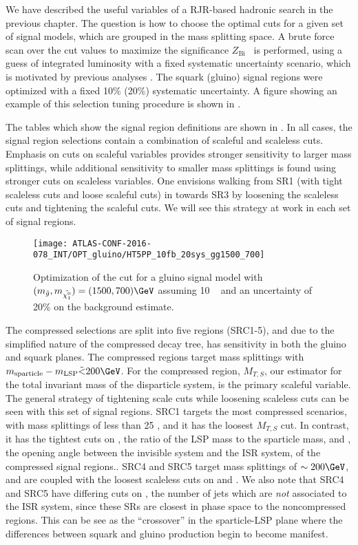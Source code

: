 We have described the useful variables of a RJR-based hadronic search in the previous chapter.
The question is how to choose the optimal cuts for a given set of signal models, which are grouped in the mass splitting space.
A brute force scan over the cut values to maximize the significance  $Z_{\text{Bi}}$~\cite{Cousins:2008zz} is performed, using a guess of integrated luminosity with a fixed systematic uncertainty scenario, which is motivated by previous analyses \cite{0-leptonPaper,0LPaper_13TeV}.
The squark (gluino) signal regions were optimized with a fixed 10\% (20\%) systematic uncertainty.
A figure showing an example of this selection tuning procedure is shown in .

The tables which show the signal region definitions are shown in .
In all cases, the signal region selections contain a combination of scaleful and scaleless cuts.
Emphasis on cuts on scaleful variables provides stronger sensitivity to larger mass splittings, while additional sensitivity to smaller mass splittings is found using stronger cuts on scaleless variables.
One envisions walking from SR1 (with tight scaleless cuts and loose scaleful cuts) in  towards SR3 by loosening the scaleless cuts and tightening the scaleful cuts.
We will see this strategy at work in each set of signal regions.

\begin{figure}[tbp]
\caption{Optimization of the  cut for a gluino signal model with $(m_{\gluino}, m_{\lsp} ) = (1500,700) \GeV $ assuming 10 \ifb~ and an uncertainty of 20\% on the background estimate.
} \label{fig:sr_optimization}
\texttt{[image: ATLAS-CONF-2016-078\_INT/OPT\_gluino/HT5PP\_10fb\_20sys\_gg1500\_700]}
\end{figure}

The compressed selections are split into five regions (SRC1-5), and due to the simplified nature of the compressed decay tree, has sensitivity in both the gluino and squark planes.
The compressed regions target mass splittings with $m_{\text{sparticle}} - m_{\text{LSP}} \tilde{<} 200 \GeV$.
For the compressed region, $M_{T, S}$, our estimator for the total invariant mass of the disparticle system, is the primary scaleful variable.
The general strategy of tightening scale cuts while loosening scaleless cuts can be seen with this set of signal regions.
SRC1 targets the most compressed scenarios, with mass splittings of less than 25 \GeV, and it has the loosest $M_{T, S}$ cut.
In contrast, it has the tightest cuts on \risr, the ratio of the LSP mass to the sparticle mass, and \dphiISR, the opening angle between the invisible system and the ISR system, of the compressed signal regions..
SRC4 and SRC5 target mass splittings of $\order 200 \GeV$, and are coupled with the loosest scaleless cuts on \risr and \dphiISR.
We also note that SRC4 and SRC5 have differing cuts on \NVjet, the number of jets which are \textit{not} associated to the ISR system, since these SRs are closest in phase space to the noncompressed regions.
This can be see as the ``crossover'' in the sparticle-LSP plane where the differences between squark and gluino production begin to become manifest.

